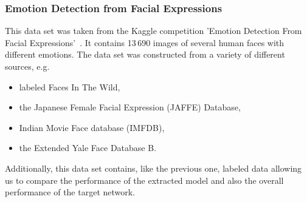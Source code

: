 \documentclass[a4paper,11pt]{article}
\begin{document}
        \subsubsection{Emotion Detection from Facial Expressions}
            This data set was taken from the Kaggle competition 'Emotion Detection From Facial Expressions'~\cite{kaggle-emotion}. 
            It contains 13\,690 images of several human faces with different emotions. The data set was constructed from a variety of different sources, e.g.
            \begin{itemize}
                \item labeled Faces In The Wild,
                \item the Japanese Female Facial Expression (JAFFE) Database,
                \item Indian Movie Face database (IMFDB),
                \item the Extended Yale Face Database B.
            \end{itemize}
            
            Additionally, this data set contains, like the previous one, labeled data allowing us to compare the performance of the extracted model and also the overall performance of the target network.
    
\end{document}
